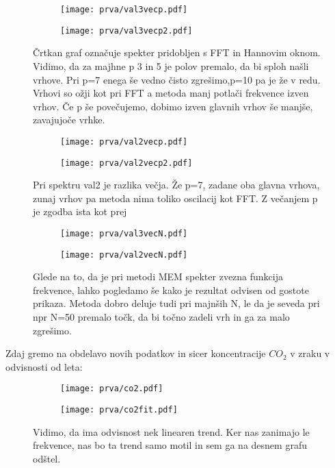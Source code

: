 \documentclass{article}
\begin{document}
\begin{figure}[H]
\centering
\begin{subfigure}{.49\textwidth}
\texttt{[image: prva/val3vecp.pdf]}
\end{subfigure}
\begin{subfigure}{.49\textwidth}
\texttt{[image: prva/val3vecp2.pdf]}
\end{subfigure}
\caption*{Črtkan graf označuje spekter pridobljen s FFT in Hannovim oknom. Vidimo, da za majhne p 3 in 5 je polov premalo, da bi sploh našli vrhove. Pri p=7 enega še vedno čisto zgrešimo,p=10 pa je že v redu. Vrhovi so ožji kot pri FFT a metoda manj potlači frekvence izven vrhov. Če p še povečujemo, dobimo izven glavnih  vrhov še manjše, zavajujoče vrhke.}
\end{figure}

\begin{figure}[H]
\centering
\begin{subfigure}{.49\textwidth}
\texttt{[image: prva/val2vecp.pdf]}
\end{subfigure}
\begin{subfigure}{.49\textwidth}
\texttt{[image: prva/val2vecp2.pdf]}
\end{subfigure}
\caption*{Pri spektru val2 je razlika večja. Že p=7, zadane oba glavna vrhova, zunaj vrhov pa metoda nima toliko oscilacij kot FFT. Z večanjem p je zgodba ista kot prej}
\end{figure}

\begin{figure}[H]
\centering
\begin{subfigure}{.49\textwidth}
\texttt{[image: prva/val3vecN.pdf]}
\end{subfigure}
\begin{subfigure}{.49\textwidth}
\texttt{[image: prva/val2vecN.pdf]}
\end{subfigure}
\caption*{Glede na to, da je pri metodi MEM spekter zvezna funkcija frekvence, lahko pogledamo še kako je rezultat odvisen od gostote prikaza. Metoda dobro deluje tudi pri majnših N, le da je seveda pri npr N=50 premalo točk, da bi točno zadeli vrh in ga za malo zgrešimo.}
\end{figure}

Zdaj gremo na obdelavo novih podatkov in sicer koncentracije $CO_2$ v zraku v odvisnosti od leta:

\begin{figure}[H]
\centering
\begin{subfigure}{.49\textwidth}
\texttt{[image: prva/co2.pdf]}
\end{subfigure}
\begin{subfigure}{.49\textwidth}
\texttt{[image: prva/co2fit.pdf]}
\end{subfigure}
\caption*{Vidimo, da ima odvisnost nek linearen trend. Ker nas zanimajo le frekvence, nas bo ta trend samo motil in sem ga na desnem grafu odštel.}
\end{figure}
\end{document}
